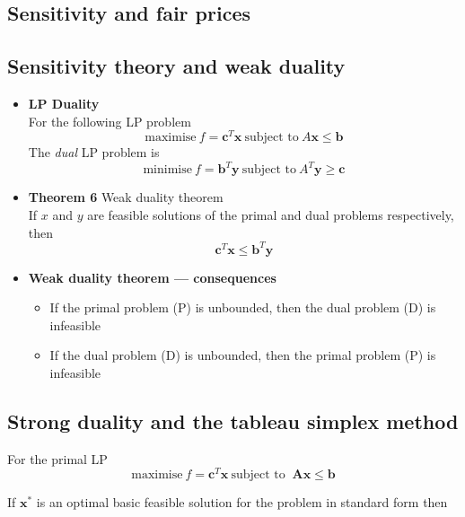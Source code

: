 \documentclass[11pt,a4paper]{article}
\begin{document}
\subsection*{Sensitivity and fair prices}

\subsection*{Sensitivity theory and weak duality}

\begin{itemize}
    \item \textbf{LP Duality} \\
        For the following LP problem
        \[
            \text{maximise} \ f =
            \textbf{c}^T \textbf{x} \ \text{subject to} \ A\textbf{x} \leq \textbf{b}
        \]
        The \emph{dual} LP problem is
        \[
            \text{minimise} \ f =
            \textbf{b}^T \textbf{y} \ \text{subject to} \ A^T\textbf{y} \geq \textbf{c}
        \]

    \item \textbf{Theorem 6} Weak duality theorem \\
        If $x$ and $y$ are feasible solutions of the primal and dual problems respectively, then
        \[
            \textbf{c}^T \textbf{x} \leq \textbf{b}^T \textbf{y}
        \]

    \item \textbf{Weak duality theorem --- consequences}
        \begin{itemize}
            \item If the primal problem (P) is unbounded, then the dual problem (D) is infeasible
            \item If the dual problem (D) is unbounded, then the primal problem (P) is infeasible
        \end{itemize}

\end{itemize}

\subsection*{Strong duality and the tableau simplex method}
For the primal LP
\[
    \text{maximise} \ f = \textbf{c}^T \textbf{x} \ \text{subject to } \ \textbf{Ax} \leq \textbf{b}
\]

If $\textbf{x}^*$ is an optimal basic feasible solution for the problem in standard form then
\end{document}

